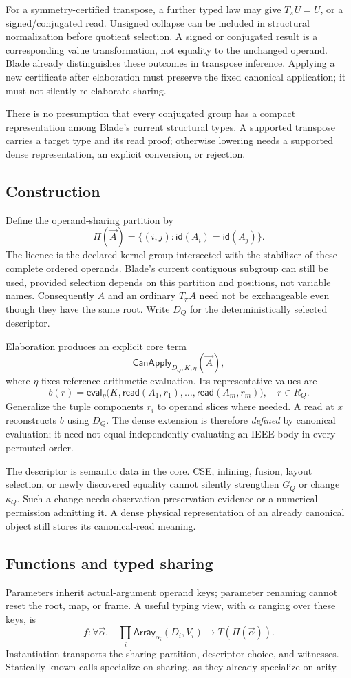 \documentclass[11pt]{article}
\newcommand{\Can}{\mathsf{CanApply}}
\newcommand{\rd}{\mathsf{read}}
\newcommand{\cid}{\mathsf{id}}
\begin{document}
For a symmetry-certified transpose, a further typed law may give $T_\pi U=U$, or a signed/conjugated read. Unsigned collapse can be included in structural normalization before quotient selection. A signed or conjugated result is a corresponding value transformation, not equality to the unchanged operand. Blade already distinguishes these outcomes in transpose inference. Applying a new certificate after elaboration must preserve the fixed canonical application; it must not silently re-elaborate sharing.

There is no presumption that every conjugated group has a compact representation among Blade's current structural types. A supported transpose carries a target type and its read proof; otherwise lowering needs a supported dense representation, an explicit conversion, or rejection.

\subsection{Construction}
Define the operand-sharing partition by
\[
 \Pi(\vec A)=\{(i,j):\cid(A_i)=\cid(A_j)\}.
\]
The licence is the declared kernel group intersected with the stabilizer of these complete ordered operands. Blade's current contiguous subgroup can still be used, provided selection depends on this partition and positions, not variable names. Consequently $A$ and an ordinary $T_\pi A$ need not be exchangeable even though they have the same root. Write $D_Q$ for the deterministically selected descriptor.

Elaboration produces an explicit core term
\[
 \Can_{D_Q,K,\eta}(\vec A),
\]
where $\eta$ fixes reference arithmetic evaluation. Its representative values are
\[
 b(r)=\mathsf{eval}_{\eta}
       \bigl(K,\rd(A_1,r_1),\ldots,\rd(A_m,r_m)\bigr),\quad r\in R_Q.
\]
Generalize the tuple components $r_i$ to operand slices where needed. A read at $x$ reconstructs $b$ using $D_Q$. The dense extension is therefore \emph{defined} by canonical evaluation; it need not equal independently evaluating an IEEE body in every permuted order.

The descriptor is semantic data in the core. CSE, inlining, fusion, layout selection, or newly discovered equality cannot silently strengthen $G_Q$ or change $\kappa_Q$. Such a change needs observation-preservation evidence or a numerical permission admitting it. A dense physical representation of an already canonical object still stores its canonical-read meaning.

\subsection{Functions and typed sharing}
Parameters inherit actual-argument operand keys; parameter renaming cannot reset the root, map, or frame. A useful typing view, with $\alpha$ ranging over these keys, is
\[
 f:\forall\vec\alpha.\quad
   \prod_i\mathsf{Array}_{\alpha_i}(D_i,V_i)\longrightarrow T(\Pi(\vec\alpha)).
\]
Instantiation transports the sharing partition, descriptor choice, and witnesses. Statically known calls specialize on sharing, as they already specialize on arity.
\end{document}

